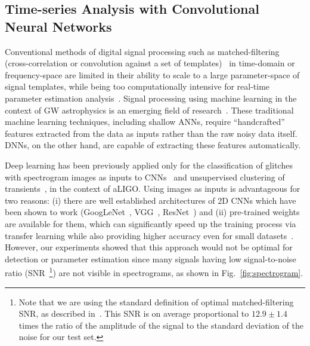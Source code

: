 \documentclass[aps,prd,%
amsmath,floats,floatfix, twocolumn, superscriptaddress,nofootinbib,showpacs]{revtex4-1}
\begin{document}
\subsection*{Time-series Analysis with Convolutional Neural Networks}

Conventional methods of digital signal processing such as matched-filtering (cross-correlation or convolution against a set of templates)~\cite{owen:1999PhRvD..60b2002O} in time-domain or frequency-space are limited in their ability to scale to a large parameter-space of signal templates, while being too computationally intensive for real-time parameter estimation analysis~\cite{Smith:2016PhRvD}. Signal processing using machine learning in the context of GW astrophysics is an emerging field of research~\cite{bambiann:2015PhRvD,bambi:2012MNRAS,DBNN,jade1:2016,jade:2015CQGra,spy:2016arXiv,DeepTransferLearning}. These traditional machine learning techniques, including shallow ANNs, require ``handcrafted'' features extracted from the data as inputs rather than the raw noisy data itself. DNNs, on the other hand, are capable of extracting these features automatically.

Deep learning has been previously applied only for the classification of glitches with spectrogram images as inputs to CNNs~\cite{GravitySpy,GravitySpy2,Geo:2017b} and unsupervised clustering of transients~\cite{Geo:2017b}, in the context of aLIGO. Using images as inputs is advantageous for two reasons: (i) there are well established architectures of 2D CNNs which have been shown to work (GoogLeNet~\cite{GoogLeNet}, VGG~\cite{VGG}, ResNet~\cite{ResNet}) and (ii) pre-trained weights are available for them, which can significantly speed up the training process via transfer learning while also providing higher accuracy even for small datasets~\cite{Geo:2017b}. However, our experiments showed that this approach would not be optimal for detection or parameter estimation since many signals having low signal-to-noise ratio (SNR~\footnote{Note that we are using the standard definition of optimal matched-filtering SNR, as described in~\cite{saton}. This SNR is on average proportional to $12.9\pm1.4$ times the ratio of the amplitude of the signal to the standard deviation of the noise for our test set.}) are not visible in spectrograms, as shown in Fig.~\ref{fig:spectrogram}. 
\end{document}
